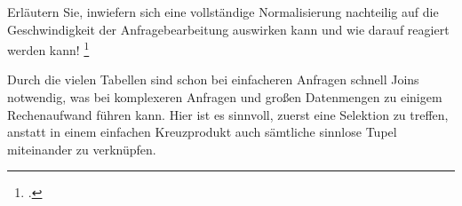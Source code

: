 \documentclass{lehramt-informatik-aufgabe}
\begin{document}
\begin{enumerate}
Erläutern Sie, inwiefern sich eine vollständige Normalisierung
nachteilig auf die Geschwindigkeit der Anfragebearbeitung auswirken kann
und wie darauf reagiert werden kann!
\footcite[Aufgabe 10: Nachteile der Normalisierung]{db:ab:klausurvorbereitung}

\begin{liAntwort}
Durch die vielen Tabellen sind schon bei einfacheren Anfragen schnell
Joins notwendig, was bei komplexeren Anfragen und großen Datenmengen zu
einigem Rechenaufwand führen kann. Hier ist es sinnvoll, zuerst eine
Selektion zu treffen, anstatt in einem einfachen Kreuzprodukt
auch sämtliche sinnlose Tupel miteinander zu verknüpfen.
\end{liAntwort}
\end{enumerate}
\end{document}
